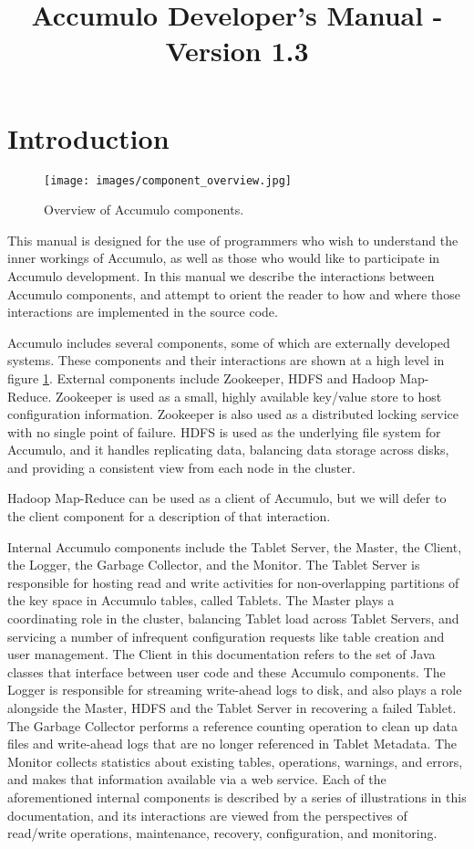 \documentclass[letterpaper,onecolumn,12pt,titlepage]{article}
\title{Accumulo Developer's Manual - Version 1.3}
\author{}
\begin{document}
\maketitle
\newpage
\tableofcontents
\newpage
\section{Introduction}

\begin{figure}[htbp]
\center
\texttt{[image: images/component\_overview.jpg]}
\caption{\label{fig_overview} Overview of Accumulo components.}
\end{figure}
This manual is designed for the use of programmers who wish to understand the inner workings of Accumulo, as well as those who would like to participate in Accumulo development.
In this manual we describe the interactions between Accumulo components, and attempt to orient the reader to how and where those interactions are implemented in the source code.

Accumulo includes several components, some of which are externally developed systems.
These components and their interactions are shown at a high level in figure \ref{fig_overview}.
External components include Zookeeper, HDFS and Hadoop Map-Reduce.
Zookeeper is used as a small, highly available key/value store to host configuration information.
Zookeeper is also used as a distributed locking service with no single point of failure.
HDFS is used as the underlying file system for Accumulo, and it handles replicating data, balancing data storage across disks, and providing a consistent view from each node in the cluster.

Hadoop Map-Reduce can be used as a client of Accumulo, but we will defer to the client component for a description of that interaction.

Internal Accumulo components include the Tablet Server, the Master, the Client, the Logger, the Garbage Collector, and the Monitor.
The Tablet Server is responsible for hosting read and write activities for non-overlapping partitions of the key space in Accumulo tables, called Tablets.
The Master plays a coordinating role in the cluster, balancing Tablet load across Tablet Servers, and servicing a number of infrequent configuration requests like table creation and user management.
The Client in this documentation refers to the set of Java classes that interface between user code and these Accumulo components.
The Logger is responsible for streaming write-ahead logs to disk, and also plays a role alongside the Master, HDFS and the Tablet Server in recovering a failed Tablet.
The Garbage Collector performs a reference counting operation to clean up data files and write-ahead logs that are no longer referenced in Tablet Metadata.
The Monitor collects statistics about existing tables, operations, warnings, and errors, and makes that information available via a web service.
Each of the aforementioned internal components is described by a series of illustrations in this documentation, and its interactions are viewed from the perspectives of read/write operations, maintenance, recovery, configuration, and monitoring.
\end{document}

